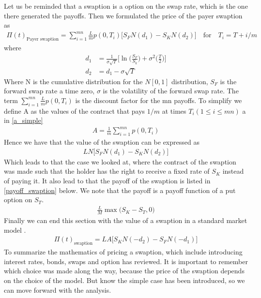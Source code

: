 Let us be reminded that a swaption is a option on the swap rate, which is the one there generated the payoffs.
Then we formulated the price of the payer swaption as \cite{Hull}
\begin{align*}
    \Pi(t)_{\text{Payer swaption}} = \sum_{i=1}^{mn} \frac{L}{m} p(0,T_i)\Big[ S_F N(d_1) - S_K N(d_2)\Big] \quad \text{for} \quad T_i= T+i/m  
\end{align*}
where
\begin{align*}
    d_1 & = \frac{1}{\sigma \sqrt{T}} \Big[ \ln \Big(\frac{S_F}{S_k}\Big)+\sigma^2\Big(\frac{T}{2}\Big)\Big] \\
    d_2 & = d_1-\sigma \sqrt{T}
\end{align*}
Where N is the cumulative distribution for the $N [0,1]$ distribution, $S_F$ is the forward swap rate a time
zero, $\sigma$ is the volatility of the forward swap rate. The term $\sum_{i=1}^{mn} \frac{L}{m} p(0,T_i)$ 
is the discount factor for the mn payoffs. To simplify we define A as the values of the contract that
pays $1/m$ at times $T_i ( 1\leq i \leq mn)$ a in \autoref{a_simple}
\begin{align}
    A= \frac{1}{m} \sum_{i=1}^{mn} p(0,T_i)
    \label{a_simple}
\end{align}
Hence we have that the value of the swaption can be expressed as 
\begin{align*}
    L N \Big[S_F N(d_1) - S_K N(d_2) \Big]
\end{align*}
Which leads to that the case we looked at, where the contract of the swaption was made such that the 
holder has the right to receive a fixed rate of $S_K$ instead of paying it. It also lead to that
the payoff of the swaption is listed in \autoref{payoff_swaption} below. We note that the payoff 
is a payoff function of a put option on $S_T$. 
\begin{align}
    \frac{L}{M} \max \Big( S_K - S_T, 0 \Big)
    \label{payoff_swaption}
\end{align}
Finally we can end this section with the value of a swaption in a standard market model \cite{Hull}.
\begin{align*}
    \Pi(t)_{\text{swaption}}= L A \Big[S_K N(-d_2) - S_F N(-d_1)\Big]
\end{align*}
To summarize the mathematics of pricing a swaption, which include introducing interest rates, 
bonds, swaps and option has reviewed. It is important to remember which choice was made along the way,
because the price of the swaption depends on the choice of the model. But know the simple case has been 
introduced, so we can move forward with the analysis. 